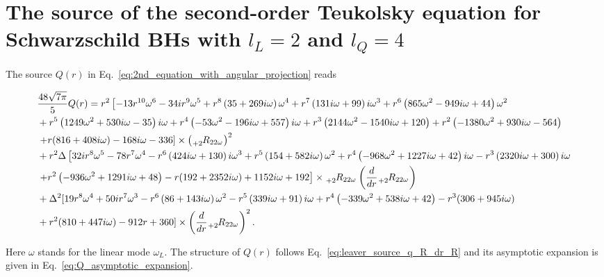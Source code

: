 \documentclass[aps,prd,amsmath,floats,floatfix, twocolumn,
superscriptaddress,nofootinbib,showpacs]{revtex4-1}
\begin{document}
\section{\texorpdfstring{The source of the second-order Teukolsky equation for Schwarzschild BHs with $l_L=2$ and $l_Q=4$}{Schwarzschild l2}}
\label{app:source_Schwarzschild_l2}
The source $Q(r)$ in Eq.~\eqref{eq:2nd_equation_with_angular_projection} reads
\begin{widetext}
\begin{align}
   &\frac{48\sqrt{7\pi}}{5} Q(r)= r^2\left[-13 r^{10} \omega ^6-34 i r^9 \omega ^5+r^8 \left(35+269 i \omega
   \right)\omega^4+r^7 \left(131 i\omega+99 \right)i\omega ^3+r^6 \left(865 \omega ^2-949
   i \omega+44\right)\omega ^2 \right.\notag \\
   &+r^5 \left(1249 \omega ^2+530 i\omega-35
   \right)i\omega+r^4 \left(-53 \omega ^2-196i \omega+557 \right)i\omega+r^3 \left(2144
   \omega ^2-1540 i \omega +120\right)+r^2 \left(-1380 \omega ^2+930 i \omega
   -564\right) \notag \\
   &\left.+r (816+408 i \omega )-168 i \omega -336\right]\times\left(\tensor[_{+2}]{{R_{22\omega}}}{}\right)^2 \notag \\
   &+ r^2\Delta\left[32 i r^8 \omega ^5-78 r^7 \omega ^4-r^6 \left(424 i\omega+130\right)i\omega ^3+r^5
   \left(154+582 i \omega\right)\omega ^2+r^4 \left(-968  \omega ^2+1227 i\omega
   +42  \right) i\omega-r^3 \left(2320 i\omega+300  \right)i\omega\right. \notag \\
   &\left.+r^2 \left(-936
   \omega ^2+1291 i \omega +48\right)-r (192+2352 i \omega )+1152 i \omega +192\right]\times \tensor[_{+2}]{{R_{22\omega}}}{}\left(\frac{d}{dr}\tensor[_{+2}]{{R_{22\omega}}}{}\right)\notag \\
    &+\Delta^2[19 r^8 \omega ^4+50 i r^7 \omega ^3-r^6 \left(86+143 i \omega \right)\omega ^2-r^5
   \left(339i \omega+91 \right)i \omega +r^4 \left(-339 \omega ^2+538 i \omega
   +42\right)-r^3 (306+945 i \omega )\notag \\
   &+r^2 (810+447 i \omega )-912 r+360]\times\left(\frac{d}{dr}\tensor[_{+2}]{{R_{22\omega}}}{}\right)^2. 
\end{align} 
\end{widetext}
Here $\omega$ stands for the linear mode $\omega_L$.
The structure of $Q(r)$ follows Eq.~\eqref{eq:leaver_source_q_R_dr_R} and its asymptotic expansion is given in Eq.~\eqref{eq:Q_asymptotic_expansion}.



\def\bibsection{\section*{References}}

\end{document}
